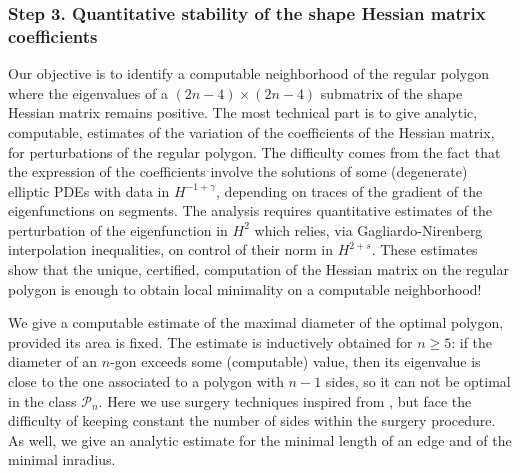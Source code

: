 \documentclass[JEP,XML,SOM,Unicode,ThmDefs,NoFloatCountersInSection,published]{cedram}
\theoremstyle{plain}
\theoremstyle{definition}
\begin{document}
\subsubsection*{Step 3. Quantitative stability of the shape Hessian matrix coefficients}
Our objective is to identify a computable neighborhood of the regular polygon where the eigenvalues of a $(2n-4)\times (2n-4)$ submatrix of the shape Hessian matrix remains positive. The most technical part is to give analytic, computable, estimates of the variation of the coefficients of the Hessian matrix, for perturbations of the regular polygon. The difficulty comes from the fact that the expression of the coefficients involve the solutions of some (degenerate) elliptic PDEs with data in $H^{-1+\gamma}$, depending on traces of the gradient of the eigenfunctions on segments. The analysis requires quantitative estimates of the perturbation of the eigenfunction in $H^2$ which relies, via Gagliardo-Nirenberg interpolation inequalities, on control of their norm in $H^{2+s}$.
These estimates
show that the unique, certified, computation of the Hessian matrix on the regular polygon is enough to obtain local minimality on a computable neighborhood!

We give a computable estimate of the maximal diameter of the optimal polygon, provided its area is fixed. The estimate is inductively obtained for $n \ge 5$: if the diameter of an $n$-gon exceeds some (computable) value, then its eigenvalue is close to the one associated to a polygon with $n-1$ sides, so it can not be optimal in the class ${\mathcal P}_n$. Here we use surgery techniques inspired from \cite{BuMa15}, but face the difficulty of keeping constant the number of sides within the surgery procedure.
As well, we give an analytic estimate for the minimal length of an edge and of the minimal inradius.
\end{document}
